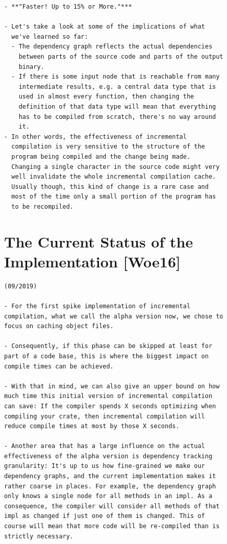 \begin{verbatim}
- **"Faster! Up to 15% or More."***

- Let's take a look at some of the implications of what
  we've learned so far:
  - The dependency graph reflects the actual dependencies
    between parts of the source code and parts of the output
    binary.
  - If there is some input node that is reachable from many
    intermediate results, e.g. a central data type that is
    used in almost every function, then changing the
    definition of that data type will mean that everything
    has to be compiled from scratch, there's no way around
    it.
- In other words, the effectiveness of incremental
  compilation is very sensitive to the structure of the
  program being compiled and the change being made.
  Changing a single character in the source code might very
  well invalidate the whole incremental compilation cache.
  Usually though, this kind of change is a rare case and
  most of the time only a small portion of the program has
  to be recompiled.
\end{verbatim}
\cite{rust_blog_incremental_compilation}

\section*{The Current Status of the Implementation [Woe16]}

\begin{verbatim}
(09/2019)

- For the first spike implementation of incremental
compilation, what we call the alpha version now, we chose to
focus on caching object files.

- Consequently, if this phase can be skipped at least for
part of a code base, this is where the biggest impact on
compile times can be achieved.

- With that in mind, we can also give an upper bound on how
much time this initial version of incremental compilation
can save: If the compiler spends X seconds optimizing when
compiling your crate, then incremental compilation will
reduce compile times at most by those X seconds.

- Another area that has a large influence on the actual
effectiveness of the alpha version is dependency tracking
granularity: It's up to us how fine-grained we make our
dependency graphs, and the current implementation makes it
rather coarse in places. For example, the dependency graph
only knows a single node for all methods in an impl. As a
consequence, the compiler will consider all methods of that
impl as changed if just one of them is changed. This of
course will mean that more code will be re-compiled than is
strictly necessary.
\end{verbatim}
\cite{rust_blog_incremental_compilation}

